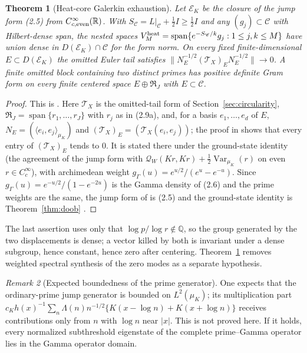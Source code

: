 \documentclass[11pt]{amsart}
\newtheorem{theorem}{Theorem}[section]
\theoremstyle{definition}
\theoremstyle{remark}
\newtheorem{remark}[theorem]{Remark}
\newcommand{\R}{\mathbb R}
\newcommand{\Q}{\mathbb Q}
\newcommand{\QW}{\mathcal Q_W}
\newcommand{\EK}{\mathscr E_K}
\DeclareMathOperator{\Var}{Var}
\begin{document}
\begin{theorem}[Heat-core Galerkin exhaustion]
\label{thm:heat}
Let \(\EK\) be the closure of the jump form (2.5) from
\(C_{c,\rm even}^\infty(\R)\).  With
\(S_{\mathscr C}=L|_{\mathscr C}+\frac12I\ge\frac12I\) and any
\((g_j)\subset\mathscr C\) with Hilbert-dense span, the nested spaces
\(V_M^{\rm heat}=\operatorname{span}\{e^{-S_{\mathscr C}/k}g_j:1\le j,k\le M\}\)
have union dense in \(D(\EK)\cap\mathscr C\) for the form norm.  On every
fixed finite-dimensional \(E\subset D(\EK)\) the omitted Euler tail
satisfies \(\|N_E^{-1/2}(\mathcal T_X)_EN_E^{-1/2}\|\to0\).  A finite
omitted block containing two distinct primes has positive definite Gram
form on every finite centered space \(E\oplus\mathfrak R_J\) with
\(E\subset\mathscr C\).
\end{theorem}

\begin{proof}
This is \cite[Theorem~9.18]{TrejoPizzo40}.  Here \(\mathcal T_X\) is the
omitted-tail form of Section~\ref{sec:circularity},
\(\mathfrak R_J=\operatorname{span}\{r_1,\dots,r_J\}\) with \(r_j\) as in
(2.9a), and, for a basis \(e_1,\dots,e_d\) of \(E\),
\(N_E=(\langle e_i,e_j\rangle_{\mu_K})\) and
\((\mathcal T_X)_E=(\mathcal T_X(e_i,e_j))\); the proof in
\cite{TrejoPizzo40} shows that every entry of \((\mathcal T_X)_E\) tends
to \(0\).  It is stated there under the
ground-state identity (the agreement of the jump form with
\(\QW(Kr,Kr)+\frac12\Var_{\mu_K}(r)\) on even \(r\in C_c^\infty\)), with
archimedean weight \(g_\Gamma(u)=e^{u/2}/(e^u-e^{-u})\).  Since
\(g_\Gamma(u)=e^{-u/2}/(1-e^{-2u})\) is the Gamma density of (2.6) and the
prime weights are the same, the jump form of \cite{TrejoPizzo40} is (2.5)
and the ground-state identity is Theorem~\ref{thm:doob}
\cite[Theorem~23.1]{TrejoPizzo39}.
\end{proof}

The last assertion uses only that \(\log p/\log r\notin\Q\), so the group
generated by the two displacements is dense; a vector killed by both is
invariant under a dense subgroup, hence constant, hence zero after
centering.  Theorem~\ref{thm:heat} removes weighted spectral synthesis of
the zero modes as a separate hypothesis.

\begin{remark}[Expected boundedness of the prime generator]
\label{thm:bounded}
One expects that the ordinary-prime jump generator is bounded on
\(L^2(\mu_K)\); its multiplication part
\(c_Kh(x)^{-1}\sum_n\Lambda(n)n^{-1/2}\{K(x-\log n)+K(x+\log n)\}\)
receives contributions only from \(n\) with \(\log n\) near \(|x|\).  This
is not proved here.  If it holds, every normalized subthreshold eigenstate
of the complete prime--Gamma operator lies in the Gamma operator domain.
\end{remark}
\end{document}
